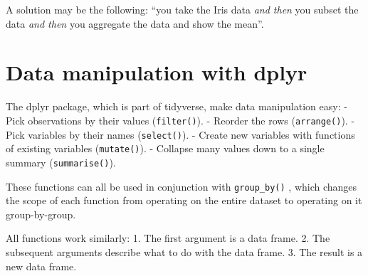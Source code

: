 \documentclass[
  12pt,
  oneside]{book}
\theoremstyle{definition}
\theoremstyle{definition}
\theoremstyle{definition}
\theoremstyle{definition}
\theoremstyle{remark}
\begin{document}
A solution may be the following: ``you take the Iris data \emph{and then} you subset the data \emph{and then} you aggregate the data and show the mean''.

\hypertarget{data-manipulation-with-dplyr}{%
\section{Data manipulation with dplyr}\label{data-manipulation-with-dplyr}}

The dplyr package, which is part of tidyverse, make data manipulation easy:
- Pick observations by their values (\texttt{filter()}).
- Reorder the rows (\texttt{arrange()}).
- Pick variables by their names (\texttt{select()}).
- Create new variables with functions of existing variables
(\texttt{mutate()}).
- Collapse many values down to a single summary (\texttt{summarise()}).

These functions can all be used in conjunction with \texttt{group\_by()} , which changes the scope of each function from operating on the entire dataset to operating on it group-by-group.

All functions work similarly:
1. The first argument is a data frame.
2. The subsequent arguments describe what to do with the data frame.
3. The result is a new data frame.
\end{document}
